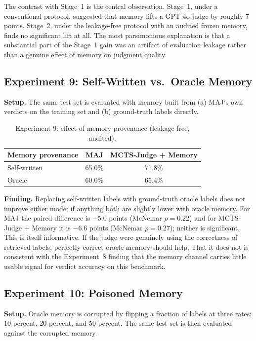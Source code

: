 \documentclass[12pt,a4paper]{report}
\begin{document}
The contrast with Stage~1 is the central observation. Stage~1, under a conventional protocol, suggested that memory lifts a GPT-4o judge by roughly 7 points. Stage~2, under the leakage-free protocol with an audited frozen memory, finds no significant lift at all. The most parsimonious explanation is that a substantial part of the Stage~1 gain was an artifact of evaluation leakage rather than a genuine effect of memory on judgment quality.

\subsection{Experiment 9: Self-Written vs.\ Oracle Memory}

\textbf{Setup.} The same test set is evaluated with memory built from (a) MAJ's own verdicts on the training set and (b) ground-truth labels directly.

\begin{table}[h]
\centering
\begin{tabular}{lcc}
\toprule
Memory provenance & MAJ & MCTS-Judge + Memory \\
\midrule
Self-written & 65.0\% & 71.8\% \\
Oracle & 60.0\% & 65.4\% \\
\bottomrule
\end{tabular}
\caption{Experiment 9: effect of memory provenance (leakage-free, audited).}
\label{tab:oracle_self}
\end{table}

\textbf{Finding.} Replacing self-written labels with ground-truth oracle labels does not improve either mode; if anything both are slightly lower with oracle memory. For MAJ the paired difference is $-5.0$ points (McNemar $p = 0.22$) and for MCTS-Judge + Memory it is $-6.6$ points (McNemar $p = 0.27$); neither is significant. This is itself informative. If the judge were genuinely using the correctness of retrieved labels, perfectly correct oracle memory should help. That it does not is consistent with the Experiment~8 finding that the memory channel carries little usable signal for verdict accuracy on this benchmark.

\subsection{Experiment 10: Poisoned Memory}
\label{sec:poison}

\textbf{Setup.} Oracle memory is corrupted by flipping a fraction of labels at three rates: 10 percent, 20 percent, and 50 percent. The same test set is then evaluated against the corrupted memory.
\end{document}

